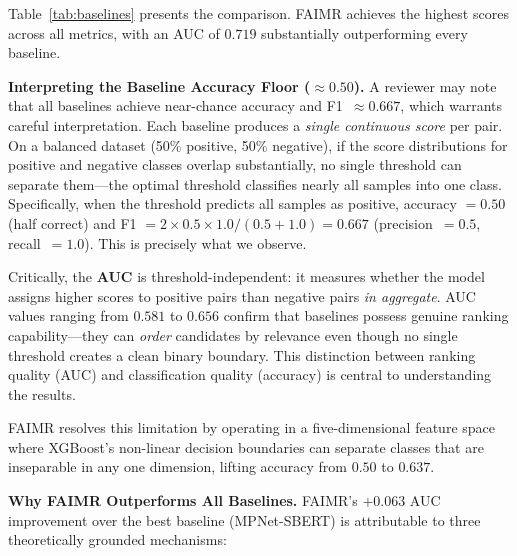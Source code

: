 \documentclass{svproc}
\begin{document}
Table~\ref{tab:baselines} presents the comparison. FAIMR achieves the highest scores across all metrics, with an AUC of $0.719$ substantially outperforming every baseline.

\textbf{Interpreting the Baseline Accuracy Floor ($\boldsymbol{\approx 0.50}$).} A reviewer may note that all baselines achieve near-chance accuracy and F1~$\approx 0.667$, which warrants careful interpretation. Each baseline produces a \textit{single continuous score} per pair. On a balanced dataset (50\% positive, 50\% negative), if the score distributions for positive and negative classes overlap substantially, no single threshold can separate them---the optimal threshold classifies nearly all samples into one class. Specifically, when the threshold predicts all samples as positive, accuracy $= 0.50$ (half correct) and F1 $= 2 \times 0.5 \times 1.0 / (0.5 + 1.0) = 0.667$ (precision~$= 0.5$, recall~$= 1.0$). This is precisely what we observe.

Critically, the \textbf{AUC} is threshold-independent: it measures whether the model assigns higher scores to positive pairs than negative pairs \textit{in aggregate}. AUC values ranging from $0.581$ to $0.656$ confirm that baselines possess genuine ranking capability---they can \textit{order} candidates by relevance even though no single threshold creates a clean binary boundary. This distinction between ranking quality (AUC) and classification quality (accuracy) is central to understanding the results.

FAIMR resolves this limitation by operating in a five-dimensional feature space where XGBoost's non-linear decision boundaries can separate classes that are inseparable in any one dimension, lifting accuracy from $0.50$ to $0.637$.

\textbf{Why FAIMR Outperforms All Baselines.} FAIMR's $+0.063$ AUC improvement over the best baseline (MPNet-SBERT) is attributable to three theoretically grounded mechanisms:
\end{document}
